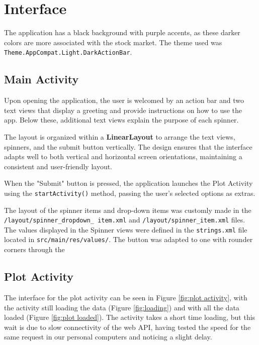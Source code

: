\documentclass{article}
\begin{document}
\section{Interface}
The application has a black background with purple accents, as these darker colors are more associated with the stock market. The theme used was \texttt{Theme.AppCompat.Light.DarkActionBar}.

\subsection{Main Activity}
Upon opening the application, the user is welcomed by an action bar and two text views that display a greeting and provide instructions on how to use the app. Below these, additional text views explain the purpose of each spinner.

The layout is organized within a \textbf{LinearLayout} to arrange the text views, spinners, and the submit button vertically. The design ensures that the interface adapts well to both vertical and horizontal screen orientations, maintaining a consistent and user-friendly layout.

When the "Submit" button is pressed, the application launches the Plot Activity using the \texttt{startActivity()} method, passing the user's selected options as extras.

The layout of the spinner items and drop-down items was customly made in the \texttt{/layout/spinner\_dropdown\_ item.xml} and \texttt{/layout/spinner\_item.xml} files. 
The values displayed in the Spinner views were defined in the \texttt{strings.xml} file located in \texttt{src/main/res/values/}. The button was adapted to one with rounder corners through the 


\subsection{Plot Activity}
The interface for the plot activity can be seen in Figure \ref{fig:plot activity}, with the activity still loading the data (Figure \ref{fig:loading}) and with all the data loaded (Figure \ref{fig:plot loaded}).
The activity takes a short time loading, but this wait is due to slow connectivity of the web API, having tested the speed for the same request in our personal computers and noticing a slight delay.
\end{document}

